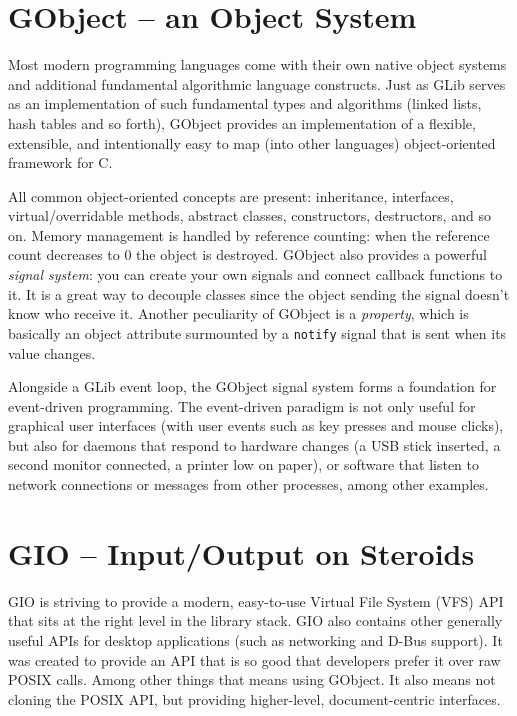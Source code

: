\documentclass[a4paper,notumble]{leaflet}
\begin{document}
\section{GObject -- an Object System}

Most modern programming languages come with their own native object systems and additional fundamental algorithmic language constructs. Just as GLib serves as an implementation of such fundamental types and algorithms (linked lists, hash tables and so forth), GObject provides an implementation of a flexible, extensible, and intentionally easy to map (into other languages) object-oriented framework for C.

All common object-oriented concepts are present: inheritance, interfaces, virtual/overridable methods, abstract classes, constructors, destructors, and so on. Memory management is handled by reference counting: when the reference count decreases to 0 the object is destroyed. GObject also provides a powerful \textit{signal system}: you can create your own signals and connect callback functions to it. It is a great way to decouple classes since the object sending the signal doesn't know who receive it. Another peculiarity of GObject is a \textit{property}, which is basically an object attribute surmounted by a \texttt{notify} signal that is sent when its value changes.

Alongside a GLib event loop, the GObject signal system forms a foundation for event-driven programming. The event-driven paradigm is not only useful for graphical user interfaces (with user events such as key presses and mouse clicks), but also for daemons that respond to hardware changes (a USB stick inserted, a second monitor connected, a printer low on paper), or software that listen to network connections or messages from other processes, among other examples.

\section{GIO -- Input/Output on Steroids}

GIO is striving to provide a modern, easy-to-use Virtual File System (VFS) API that sits at the right level in the library stack. GIO also contains other generally useful APIs for desktop applications (such as networking and D-Bus support). It was created to provide an API that is so good that developers prefer it over raw POSIX calls. Among other things that means using GObject. It also means not cloning the POSIX API, but providing higher-level, document-centric interfaces.
\end{document}
